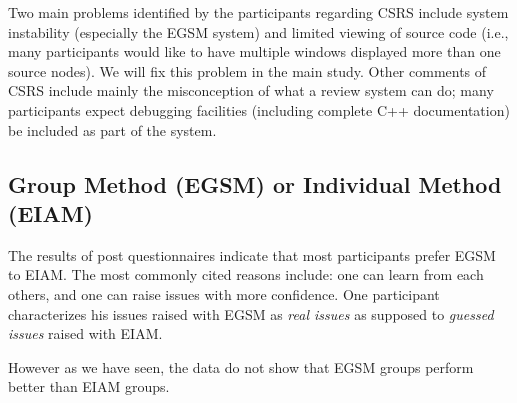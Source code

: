 Two main problems identified by the participants regarding CSRS
include system instability (especially the EGSM system)
and limited viewing of source code (i.e., many participants
would like to have multiple windows displayed more than one source
nodes).  We will fix this problem in the main study.
Other comments of CSRS include mainly the misconception of what a
review system can do; many participants  
expect debugging facilities (including complete C++ documentation) be
included as part of the system.


\subsection{Group Method (EGSM) or Individual Method (EIAM)}
The results of post questionnaires indicate that most participants
prefer EGSM to EIAM.
The most commonly cited reasons include: 
one can learn from each others, and 
one can raise issues with more confidence. One participant
characterizes his issues raised with EGSM as {\it real issues} 
as supposed to {\it guessed issues} raised with EIAM.

However as we have seen, the data do not show that EGSM groups perform
better than EIAM groups. 

\newpage
\appendix

























\newpage






